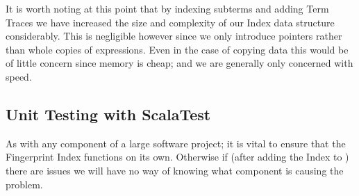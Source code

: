 It is worth noting at this point that by indexing subterms and adding Term Traces we have
increased the size and complexity of our Index data structure considerably.
This is negligible however since we only introduce pointers rather than whole
copies of expressions. Even in the case of copying data this would be of little
concern since memory is cheap; and we are generally only concerned with speed.

\subsection{Unit Testing with ScalaTest}
\label{sec:unittest}

As with any component of a large software project; it is vital to ensure that the
Fingerprint Index functions on its own. Otherwise if (after adding the Index to
\beagle) there are issues we will have no way of knowing what component is
causing the problem.


